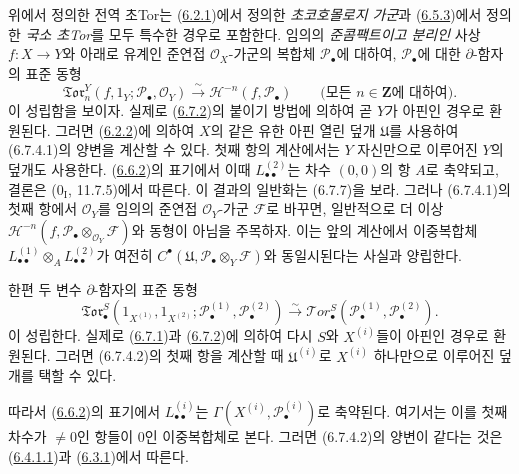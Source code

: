 \begin{remark}[6.7.4]
\label{III.6.7.4-fr}
위에서 정의한 전역 초Tor는
(\hyperref[III.6.2.1-fr]{6.2.1})에서 정의한
\emph{초코호몰로지 가군}과
(\hyperref[III.6.5.3-fr]{6.5.3})에서 정의한 \emph{국소 초Tor}를
모두 특수한 경우로 포함한다. 임의의 \emph{준콤팩트이고 분리인}
사상 $f:X\to Y$와 아래로 유계인 준연접 $\mathscr O_X$-가군의
복합체 $\mathscr P_\bullet$에 대하여, $\mathscr P_\bullet$에 대한
$\partial$-함자의 표준 동형
\[
  \mathfrak{Tor}_n^Y(f,1_Y;\mathscr P_\bullet,\mathscr O_Y)
  \xrightarrow{\sim}
  \mathscr H^{-n}(f,\mathscr P_\bullet)
  \qquad\text{(모든 $n\in\mathbf Z$에 대하여)}.
  \tag{6.7.4.1}\label{III.6.7.4.1.fr}
\]
이 성립함을 보이자. 실제로
(\hyperref[III.6.7.2-fr]{6.7.2})의 붙이기 방법에 의하여 곧 $Y$가
아핀인 경우로 환원된다. 그러면 (\hyperref[III.6.2.2-fr]{6.2.2})에
의하여 $X$의 같은 유한 아핀 열린 덮개 $\mathfrak U$를 사용하여
(6.7.4.1)의 양변을 계산할 수 있다. 첫째 항의 계산에서는 $Y$
자신만으로 이루어진 $Y$의 덮개도 사용한다.
(\hyperref[III.6.6.2-fr]{6.6.2})의 표기에서 이때
$L_{\bullet\bullet}^{(2)}$는 차수 $(0,0)$의 항 $A$로 축약되고,
결론은 ($0_{\mathrm I}$, 11.7.5)에서 따른다. 이 결과의 일반화는
(6.7.7)을 보라. 그러나 (6.7.4.1)의 첫째 항에서 $\mathscr O_Y$를
임의의 준연접 $\mathscr O_Y$-가군 $\mathscr F$로 바꾸면, 일반적으로
더 이상
$\mathscr H^{-n}(f,\mathscr P_\bullet\otimes_{\mathscr O_Y}\mathscr F)$와
동형이 아님을 주목하자. 이는 앞의 계산에서 이중복합체
$L_{\bullet\bullet}^{(1)}\otimes_A L_{\bullet\bullet}^{(2)}$가 여전히
$C^\bullet(\mathfrak U,\mathscr P_\bullet\otimes_Y\mathscr F)$와
동일시된다는 사실과 양립한다.

한편 두 변수 $\partial$-함자의 표준 동형
\[
  \mathfrak{Tor}_\bullet^S
  (1_{X^{(1)}},1_{X^{(2)}};
   \mathscr P_\bullet^{(1)},\mathscr P_\bullet^{(2)})
  \xrightarrow{\sim}
  \mathscr{T}\!or_\bullet^S
  (\mathscr P_\bullet^{(1)},\mathscr P_\bullet^{(2)}).
  \tag{6.7.4.2}\label{III.6.7.4.2.fr}
\]
이 성립한다. 실제로 (\hyperref[III.6.7.1-fr]{6.7.1})과
(\hyperref[III.6.7.2-fr]{6.7.2})에 의하여 다시 $S$와
$X^{(i)}$들이 아핀인 경우로 환원된다. 그러면 (6.7.4.2)의 첫째 항을
계산할 때 $\mathfrak U^{(i)}$로 $X^{(i)}$ 하나만으로 이루어진
덮개를 택할 수 있다.


따라서 (\hyperref[III.6.6.2-fr]{6.6.2})의 표기에서
$L_{\bullet\bullet}^{(i)}$는
$\Gamma(X^{(i)},\mathscr P_\bullet^{(i)})$로 축약된다. 여기서는 이를
첫째 차수가 $\ne0$인 항들이 0인 이중복합체로 본다. 그러면
(6.7.4.2)의 양변이 같다는 것은
(\hyperref[III.6.4.1.1.fr]{6.4.1.1})과
(\hyperref[III.6.3.1-fr]{6.3.1})에서 따른다.
\end{remark}

